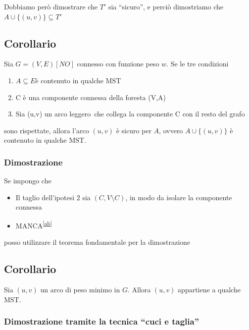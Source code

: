 \documentclass{article}
\providecommand{\tightlist}{%
  \setlength{\itemsep}{0pt}\setlength{\parskip}{0pt}}
\begin{document}
{{{{Dobbiamo però dimostrare che $T'$ sia ``sicuro'', e perciò dimostriamo che \\ $A \cup \{(u,v)\} \subseteq T'$}

\subsection{Corollario}

{Sia $G=(V,E) [NO]$ connesso con funzione peso $w$. Se le tre condizioni}

\begin{enumerate}
\tightlist
\item
  $A \subseteq E${è contenuto in qualche MST}
\item
  {C è una componente connessa della foresta (V,A)}
\item
  {Sia (u,v) un arco }{leggero}{~che collega la componente C con il
  resto del grafo}
\end{enumerate}

{sono rispettate, allora l'arco $(u,v)$ è sicuro per $A$, ovvero $A \cup \{(u,v)\}$ è contenuto in qualche MST.}


\subsubsection{Dimostrazione}

{Se impongo che}

\begin{itemize}
\tightlist
\item
  {Il taglio dell'ipotesi 2 sia $(C,V\setminus C)$, in modo da isolare la componente connessa}
\item
  {MANCA}\textsuperscript{\protect\hyperlink{cmnt28}{{[}ab{]}}}
\end{itemize}

{posso utilizzare il teorema fondamentale per la dimostrazione}

\subsection{Corollario}

{Sia $(u,v)$ un arco di peso minimo in $G$. Allora $(u,v)$ appartiene a qualche MST.}

\subsubsection{Dimostrazione tramite la tecnica ``cuci e taglia''}

}}}
\end{document}
